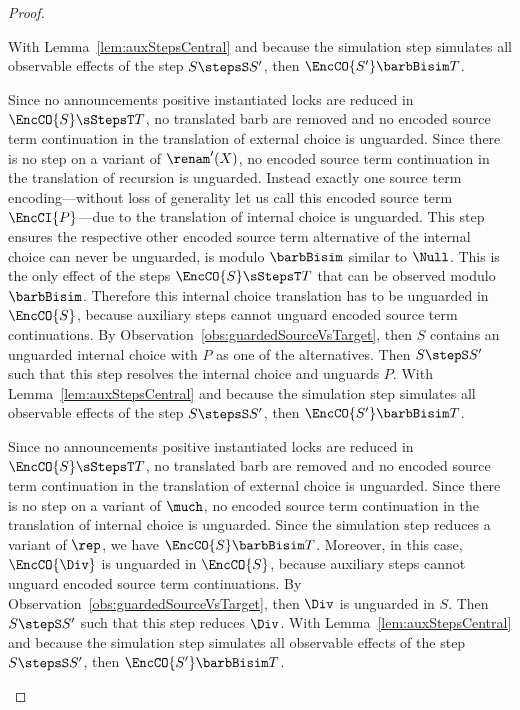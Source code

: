 \documentclass[]{eptcs}
\begin{document}
\begin{proof}
\begin{compactitem}
\begin{compactenum}
					With Lemma~\ref{lem:auxStepsCentral} and because the simulation step simulates all observable effects of the step $ S \stepsS S' $, then $ \EncCO{S'} \barbBisim T $.
				\item Since no announcements \wrt positive instantiated locks are reduced in $ \EncCO{S} \sStepsT T $, no translated barb are removed and no encoded source term continuation in the translation of external choice is unguarded. Since there is no step on a variant of $ \renam'(X) $, no encoded source term continuation in the translation of recursion is unguarded. Instead exactly one source term encoding---without loss of generality let us call this encoded source term $ \EncCI{P} $---due to the translation of internal choice is unguarded. This step ensures the respective other encoded source term alternative of the internal choice can never be unguarded, \ie is modulo $ \barbBisim $ similar to $ \Null $. This is the only effect of the steps $ \EncCO{S} \sStepsT T $ that can be observed modulo $ \barbBisim $. Therefore this internal choice translation has to be unguarded in $ \EncCO{S} $, because auxiliary steps cannot unguard encoded source term continuations. By Observation~\ref{obs:guardedSourceVsTarget}, then $ S $ contains an unguarded internal choice with $ P $ as one of the alternatives. Then $ S \stepS S' $ such that this step resolves the internal choice and unguards $ P $. With Lemma~\ref{lem:auxStepsCentral} and because the simulation step simulates all observable effects of the step $ S \stepsS S' $, then $ \EncCO{S'} \barbBisim T $.
				\item Since no announcements \wrt positive instantiated locks are reduced in $ \EncCO{S} \sStepsT T $, no translated barb are removed and no encoded source term continuation in the translation of external choice is unguarded. Since there is no step on a variant of $ \much $, no encoded source term continuation in the translation of internal choice is unguarded. Since the simulation step reduces a variant of $ \rep $, we have $ \EncCO{S} \barbBisim T $. Moreover, in this case, $ \EncCO{\Div} $ is unguarded in $ \EncCO{S} $, because auxiliary steps cannot unguard encoded source term continuations. By Observation~\ref{obs:guardedSourceVsTarget}, then $ \Div $ is unguarded in $ S $. Then $ S \stepS S' $ such that this step reduces $ \Div $. With Lemma~\ref{lem:auxStepsCentral} and because the simulation step simulates all observable effects of the step $ S \stepsS S' $, then $ \EncCO{S'} \barbBisim T $.

\end{compactenum}
\end{compactitem}
\end{proof}
\end{document}

